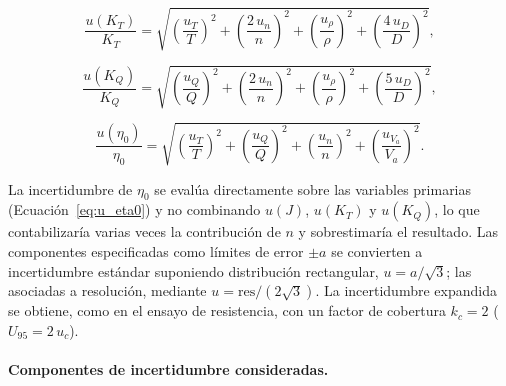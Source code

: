 \begin{equation}
\frac{u(K_T)}{K_T} = \sqrt{\left(\frac{u_T}{T}\right)^{2}
+ \left(\frac{2\,u_n}{n}\right)^{2}
+ \left(\frac{u_\rho}{\rho}\right)^{2}
+ \left(\frac{4\,u_D}{D}\right)^{2}},
\end{equation}

\begin{equation}
\frac{u(K_Q)}{K_Q} = \sqrt{\left(\frac{u_Q}{Q}\right)^{2}
+ \left(\frac{2\,u_n}{n}\right)^{2}
+ \left(\frac{u_\rho}{\rho}\right)^{2}
+ \left(\frac{5\,u_D}{D}\right)^{2}},
\end{equation}

\begin{equation}
\frac{u(\eta_0)}{\eta_0} = \sqrt{\left(\frac{u_T}{T}\right)^{2}
+ \left(\frac{u_Q}{Q}\right)^{2}
+ \left(\frac{u_n}{n}\right)^{2}
+ \left(\frac{u_{V_a}}{V_a}\right)^{2}}.
\label{eq:u_eta0}
\end{equation}

La incertidumbre de $\eta_0$ se evalúa directamente sobre las variables primarias (Ecuación~\ref{eq:u_eta0}) y no combinando $u(J)$, $u(K_T)$ y $u(K_Q)$, lo que contabilizaría varias veces la contribución de $n$ y sobrestimaría el resultado. Las componentes especificadas como límites de error $\pm a$ se convierten a incertidumbre estándar suponiendo distribución rectangular, $u = a/\sqrt{3}$; las asociadas a resolución, mediante $u = \mathrm{res}/(2\sqrt{3})$. La incertidumbre expandida se obtiene, como en el ensayo de resistencia, con un factor de cobertura $k_c = 2$ ($U_{95} = 2\,u_c$).

\paragraph{Componentes de incertidumbre consideradas.}

